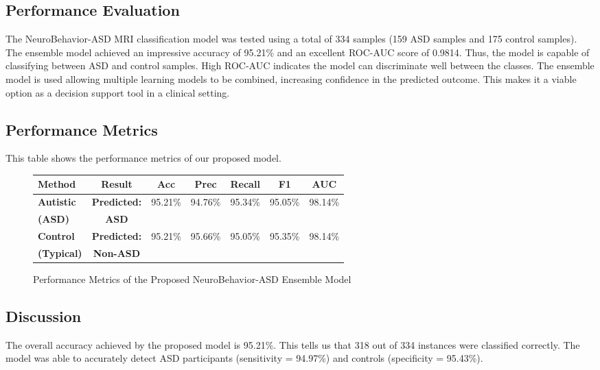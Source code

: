\documentclass[conference]{IEEEtran}
\begin{document}
\subsection{Performance Evaluation}
The NeuroBehavior-ASD MRI classification model was tested using a total of 334 samples (159 ASD samples and 175 control samples). The ensemble model achieved an impressive accuracy of 95.21\% and an excellent ROC-AUC score of 0.9814. Thus, the model is capable of classifying between ASD and control samples. High ROC-AUC indicates the model can discriminate well between the classes. The ensemble model is used allowing multiple learning models to be combined, increasing confidence in the predicted outcome. This makes it a viable option as a decision support tool in a clinical setting.

\subsection{Performance Metrics}
This table shows the performance metrics of our proposed model.

\begin{figure}[h]
\centering
\begin{tabular}{|l|c|c|c|c|c|c|}
\hline
\textbf{Method} & \textbf{Result} & \textbf{Acc} & \textbf{Prec} & \textbf{Recall} & \textbf{F1} & \textbf{AUC} \\
\hline
\textbf{Autistic} & \textbf{Predicted:} & \multirow{2}{*}{95.21\%} & \multirow{2}{*}{94.76\%} & \multirow{2}{*}{95.34\%} & \multirow{2}{*}{95.05\%} & \multirow{2}{*}{98.14\%} \\
\textbf{(ASD)} & \textbf{ASD} & & & & & \\
\hline
\textbf{Control} & \textbf{Predicted:} & \multirow{2}{*}{95.21\%} & \multirow{2}{*}{95.66\%} & \multirow{2}{*}{95.05\%} & \multirow{2}{*}{95.35\%} & \multirow{2}{*}{98.14\%} \\
\textbf{(Typical)} & \textbf{Non-ASD} & & & & & \\
\hline
\end{tabular}
\caption{Performance Metrics of the Proposed NeuroBehavior-ASD Ensemble Model}
\label{fig:performance_metrics}
\end{figure}

\subsection{Discussion}
The overall accuracy achieved by the proposed model is 95.21\%. This tells us that 318 out of 334 instances were classified correctly. The model was able to accurately detect ASD participants (sensitivity = 94.97\%) and controls (specificity = 95.43\%).
\end{document}
